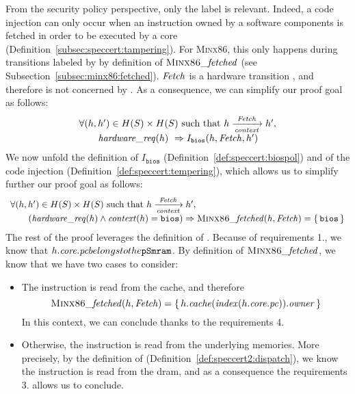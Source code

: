 From the security policy perspective, only the  label is relevant.
%
Indeed, a code injection can only occur when an instruction owned by a software
components is fetched in order to be executed by a core
(Definition~\ref{subsec:speccert:tampering}).
%
For {\scshape Minx86}, this only happens during transitions labeled by
 by definition of \( \textsc{Minx86}\mathit{\_fetched} \) (see
Subsection~\ref{subsec:minx86:fetched}).
%
\( \mathit{Fetch} \) is a hardware transition , and therefore is not concerned by
. 
%
As a consequence, we can simplify our proof goal as follows:
%
\[
  \begin{array}{l}
    \forall (h, h') \in H(S) \times H(S) \text{ such that } h
    \xrightarrow[\mathit{context}]{\mathit{Fetch}} h', \\
    \qquad \mathit{hardware\_req}(h)\ \Rightarrow I_{\mathtt{bios}}(h, \mathit{Fetch}, h')
  \end{array}
\]
%
We now unfold the definition of \( I_{\mathtt{bios}} \)
(Definition~\ref{def:speccert:biospol}) and of the code injection
(Definition~\ref{def:speccert:tempering}), which allows us to simplify further
our proof goal as follows:
%
\[
  \begin{array}{l}
    \forall (h, h') \in H(S) \times H(S) \text{ such that } h
    \xrightarrow[\mathit{context}]{\mathit{Fetch}} h', \\
    \qquad (\mathit{hardware\_req}(h) \wedge \mathit{context}(h) = \mathtt{bios})
    \Rightarrow \textsc{Minx86}\mathit{\_fetched}(h, \mathit{Fetch}) =
    \{\,\mathtt{bios}\,\}
  \end{array}
\]
%
The rest of the proof leverages the definition of .
%
Because of requirements 1., we know that
\( h.\mathit{core}.\mathit{pc} belongs to the \texttt{pSmram} \). 
%
By definition of \( \textsc{Minx86}\mathit{\_fetched} \), we know that we have two
cases to consider:
%
\begin{itemize}
\item The instruction is read from the cache, and therefore
  \[
    \textsc{Minx86}\mathit{\_fetched}(h, \mathit{Fetch}) =
    \{\,h.\mathit{cache}(\mathit{index}(h.\mathit{core}.\mathit{pc})).\mathit{owner}\,\}
  \]
  In this context, we can conclude thanks to the requirements 4.
\item Otherwise, the instruction is read from the underlying memories.
  More precisely, by the definition of 
  (Definition~\ref{def:speccert2:dispatch}), we know the instruction is read
  from the \ac{dram}, and as a consequence the requirements 3. allows us to
  conclude.
\end{itemize}

